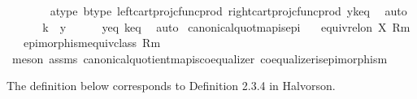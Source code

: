 \begin{isabellebody}
\ \ \ \ \ \ \isamarkupfalse%
\ a{\isacharunderscore}{\kern0pt}type\ b{\isacharunderscore}{\kern0pt}type\ left{\isacharunderscore}{\kern0pt}cart{\isacharunderscore}{\kern0pt}proj{\isacharunderscore}{\kern0pt}cfunc{\isacharunderscore}{\kern0pt}prod\ right{\isacharunderscore}{\kern0pt}cart{\isacharunderscore}{\kern0pt}proj{\isacharunderscore}{\kern0pt}cfunc{\isacharunderscore}{\kern0pt}prod\ y{\isacharunderscore}{\kern0pt}k{\isacharunderscore}{\kern0pt}eq\ \isamarkupfalse%
\ auto\isanewline
\ \ \isamarkupfalse%
\isanewline
\ \ \isamarkupfalse%
\ {\isachardoublequoteopen}k\ {\isacharequal}{\kern0pt}\ y{\isachardoublequoteclose}\isanewline
\ \ \ \ \isamarkupfalse%
\ y{\isacharunderscore}{\kern0pt}eq\ k{\isacharunderscore}{\kern0pt}eq\ \isamarkupfalse%
\ auto\isanewline
{}\isamarkupfalse%
%
\endisatagproof
{\isafoldproof}%
%
\isadelimproof
\isanewline
%
\endisadelimproof
\isanewline
{}\isamarkupfalse%
\ canonical{\isacharunderscore}{\kern0pt}quot{\isacharunderscore}{\kern0pt}map{\isacharunderscore}{\kern0pt}is{\isacharunderscore}{\kern0pt}epi{\isacharcolon}{\kern0pt}\isanewline
\ \ \ {\isachardoublequoteopen}equiv{\isacharunderscore}{\kern0pt}rel{\isacharunderscore}{\kern0pt}on\ X\ {\isacharparenleft}{\kern0pt}R{\isacharcomma}{\kern0pt}m{\isacharparenright}{\kern0pt}{\isachardoublequoteclose}\isanewline
\ \ \ {\isachardoublequoteopen}epimorphism{\isacharparenleft}{\kern0pt}{\isacharparenleft}{\kern0pt}equiv{\isacharunderscore}{\kern0pt}class\ {\isacharparenleft}{\kern0pt}R{\isacharcomma}{\kern0pt}m{\isacharparenright}{\kern0pt}{\isacharparenright}{\kern0pt}{\isacharparenright}{\kern0pt}{\isachardoublequoteclose}\isanewline
%
\isadelimproof
\ \ %
\endisadelimproof
%
\isatagproof
{}\isamarkupfalse%
\ {\isacharparenleft}{\kern0pt}meson\ assms\ canonical{\isacharunderscore}{\kern0pt}quotient{\isacharunderscore}{\kern0pt}map{\isacharunderscore}{\kern0pt}is{\isacharunderscore}{\kern0pt}coequalizer\ coequalizer{\isacharunderscore}{\kern0pt}is{\isacharunderscore}{\kern0pt}epimorphism{\isacharparenright}{\kern0pt}%
\endisatagproof
{\isafoldproof}%
%
\isadelimproof
%
\endisadelimproof
%
\isadelimdocument
%
\endisadelimdocument
%
\isatagdocument
%
\isamarkuptrue%
%
\endisatagdocument
{\isafolddocument}%
%
\isadelimdocument
%
\endisadelimdocument
%
\begin{isamarkuptext}%
The definition below corresponds to Definition 2.3.4 in Halvorson.%

\end{isamarkuptext}
\end{isabellebody}
